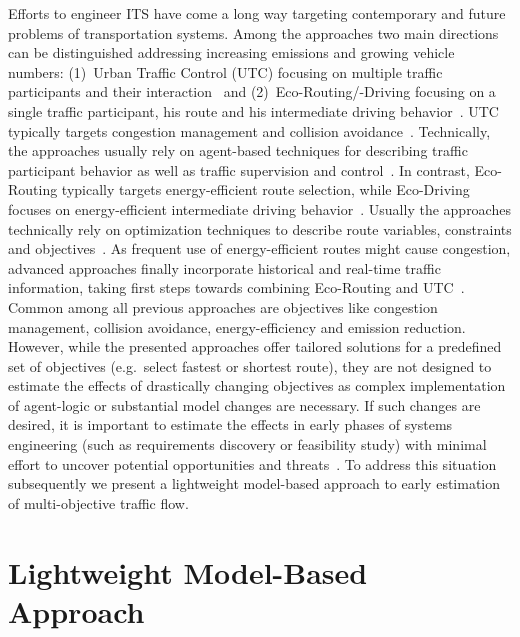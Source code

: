 \documentclass[conference]{../cls/IEEEtran}
\begin{document}
Efforts to engineer ITS have come a long way targeting contemporary and future
problems of transportation systems. Among the approaches two main directions can
be distinguished addressing increasing emissions and growing vehicle numbers:
(1)~Urban Traffic Control (UTC) focusing on multiple traffic participants and
their interaction~\cite{Chen2010} and (2)~Eco-Routing/-Driving focusing
on a single traffic participant, his route and his intermediate driving
behavior~\cite{Ericsson2006,Boriboonsomsin2012}. UTC typically targets
congestion management and collision avoidance~\cite{Chen2010}. Technically, the
approaches usually rely on agent-based techniques for describing traffic
participant behavior as well as traffic supervision and control~\cite{Chen2010}.
In contrast, Eco-Routing typically targets energy-efficient route selection,
while Eco-Driving focuses on energy-efficient intermediate driving
behavior~\cite{Ericsson2006}. Usually the approaches technically rely
on optimization techniques to describe route variables, constraints and
objectives~\cite{Ericsson2006}. As frequent use of energy-efficient routes might
cause congestion, advanced approaches finally incorporate historical and
real-time traffic information, taking first steps towards combining
Eco-Routing and UTC~\cite{Boriboonsomsin2012}. 
Common among all previous approaches are objectives like congestion management,
collision avoidance, energy-efficiency and emission reduction. 
However, while the presented approaches offer tailored solutions for a
predefined set of objectives (e.g.\ select fastest or shortest route), they are not designed to
estimate the effects of drastically changing objectives as complex
implementation of agent-logic or substantial model changes are necessary.
If such changes are desired, it is important to
estimate the effects in early phases of systems engineering (such as
requirements discovery or feasibility study) with minimal effort to uncover
potential opportunities and threats~\cite{Whitten2005}. To address this
situation subsequently we present a lightweight model-based approach to early
estimation of multi-objective traffic flow.

\section{Lightweight Model-Based Approach}
\label{sec:approach}
\end{document}
